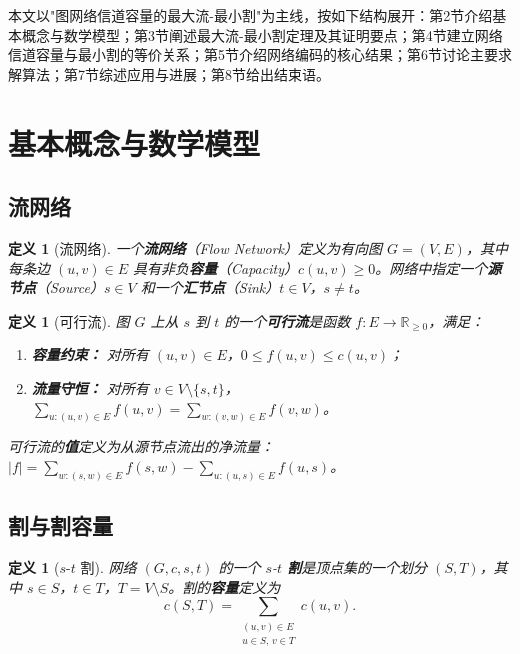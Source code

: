 \documentclass[12pt, a4paper]{article}
\newtheorem{definition}[theorem]{定义}
\begin{document}
本文以"图网络信道容量的最大流-最小割"为主线，按如下结构展开：第2节介绍基本概念与数学模型；第3节阐述最大流-最小割定理及其证明要点；第4节建立网络信道容量与最小割的等价关系；第5节介绍网络编码的核心结果；第6节讨论主要求解算法；第7节综述应用与进展；第8节给出结束语。

\section{基本概念与数学模型}

\subsection{流网络}

\begin{definition}[流网络]
一个\textbf{流网络}（Flow Network）定义为有向图 $G = (V, E)$，其中每条边 $(u,v)\in E$ 具有非负\textbf{容量}（Capacity）$c(u,v)\geq 0$。网络中指定一个\textbf{源节点}（Source）$s\in V$ 和一个\textbf{汇节点}（Sink）$t\in V$，$s\neq t$。
\end{definition}

\begin{definition}[可行流]
图 $G$ 上从 $s$ 到 $t$ 的一个\textbf{可行流}是函数 $f:E\to\mathbb{R}_{\geq 0}$，满足：
\begin{enumerate}
  \item \textbf{容量约束：} 对所有 $(u,v)\in E$，$0\leq f(u,v)\leq c(u,v)$；
  \item \textbf{流量守恒：} 对所有 $v\in V\setminus\{s,t\}$，
    $\displaystyle\sum_{u:(u,v)\in E} f(u,v) = \sum_{w:(v,w)\in E} f(v,w)$。
\end{enumerate}
可行流的\textbf{值}定义为从源节点流出的净流量：
$|f| = \sum_{w:(s,w)\in E}f(s,w) - \sum_{u:(u,s)\in E}f(u,s)$。
\end{definition}

\subsection{割与割容量}

\begin{definition}[$s$-$t$ 割]
网络 $(G,c,s,t)$ 的一个 $s$-$t$ \textbf{割}是顶点集的一个划分 $(S, T)$，其中 $s\in S$，$t\in T$，$T=V\setminus S$。割的\textbf{容量}定义为
\[
  c(S,T) = \sum_{\substack{(u,v)\in E \\ u\in S,\, v\in T}} c(u,v).
\]
\end{definition}
\end{document}
